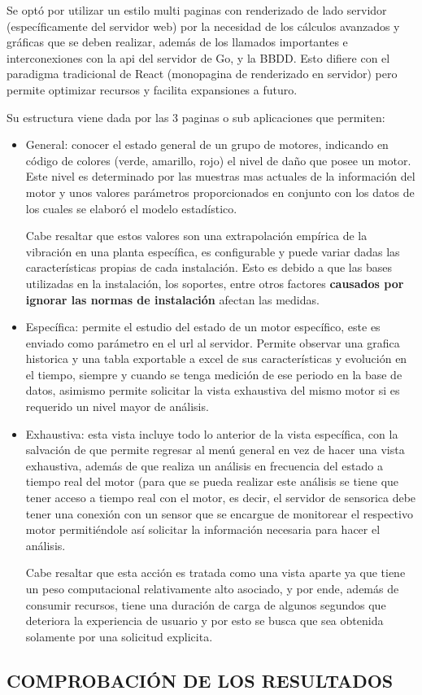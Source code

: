 Se optó por utilizar un
estilo multi paginas con renderizado de lado servidor (específicamente del
servidor web) por la necesidad de los cálculos avanzados y gráficas que
se deben realizar, además de los llamados importantes e interconexiones con la
api del servidor de Go, y la BBDD. Esto difiere con el paradigma tradicional de
React (monopagina de renderizado en servidor) pero permite optimizar recursos y
facilita expansiones a futuro.

Su estructura viene dada por las 3 paginas o sub aplicaciones que permiten:

\begin{itemize}
    \item General: conocer el estado general de un grupo de motores, indicando
        en código de colores (verde, amarillo, rojo) el nivel de daño que posee
        un motor. Este nivel es determinado por las muestras mas actuales de
        la información del motor y unos valores parámetros proporcionados en
        conjunto con los datos de los cuales se elaboró el modelo estadístico.

        Cabe resaltar que estos valores son una extrapolación empírica de la
        vibración en una planta específica, es configurable y puede variar dadas
        las características propias de cada instalación. Esto es debido a que
        las bases utilizadas en la instalación, los soportes, entre otros factores
        \textbf{causados por ignorar las normas de instalación} afectan las medidas.

    \item Específica:  permite el estudio del estado de un motor específico,
        este es enviado como parámetro en el url al servidor. Permite observar
        una grafica historica y una tabla exportable a excel de sus características y
        evolución en el tiempo, siempre y cuando se tenga medición de ese periodo
        en la base de datos, asimismo permite solicitar la vista exhaustiva del
        mismo motor si es requerido un nivel mayor de análisis.

    \item Exhaustiva: esta vista incluye todo lo anterior de la vista específica,
        con la salvación de que permite regresar al menú general en vez de hacer
        una vista exhaustiva, además de que realiza un análisis en frecuencia
        del estado a tiempo real del motor (para que se pueda realizar este
        análisis se tiene que tener acceso a tiempo real con el motor, es decir,
        el servidor de sensorica debe tener una conexión con un sensor que se
        encargue de monitorear el respectivo motor permitiéndole así solicitar
        la información necesaria para hacer el análisis.

        Cabe resaltar que esta acción es tratada como una vista aparte ya que
        tiene un peso computacional relativamente alto asociado, y por ende,
        además de consumir recursos, tiene una duración de carga de algunos
        segundos que deteriora la experiencia de usuario y por esto se busca que
        sea obtenida solamente por una solicitud explicita.
\end{itemize}




\subsection{COMPROBACIÓN DE LOS RESULTADOS}
